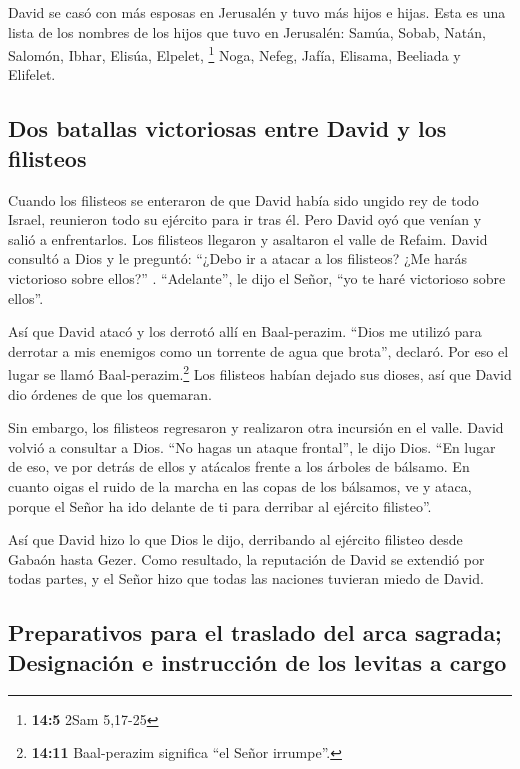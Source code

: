  David se casó con más esposas en Jerusalén y tuvo más
hijos e hijas.  Esta es una lista de los nombres de los
hijos que tuvo en Jerusalén: Samúa, Sobab, Natán, Salomón,
 Ibhar, Elisúa, Elpelet, \footnote{\textbf{14:5} 2Sam
  5,17-25}  Noga, Nefeg, Jafía,  Elisama,
Beeliada y Elifelet.

\hypertarget{dos-batallas-victoriosas-entre-david-y-los-filisteos}{%
\subsection{Dos batallas victoriosas entre David y los
filisteos}\label{dos-batallas-victoriosas-entre-david-y-los-filisteos}}

 Cuando los filisteos se enteraron de que David había sido
ungido rey de todo Israel, reunieron todo su ejército para ir tras él.
Pero David oyó que venían y salió a enfrentarlos.  Los
filisteos llegaron y asaltaron el valle de Refaim.  David
consultó a Dios y le preguntó: ``¿Debo ir a atacar a los filisteos? ¿Me
harás victorioso sobre ellos?'' . ``Adelante'', le dijo el Señor, ``yo
te haré victorioso sobre ellos''.

 Así que David atacó y los derrotó allí en Baal-perazim.
``Dios me utilizó para derrotar a mis enemigos como un torrente de agua
que brota'', declaró. Por eso el lugar se llamó Baal-perazim.\footnote{\textbf{14:11}
  Baal-perazim significa ``el Señor irrumpe''.}  Los
filisteos habían dejado sus dioses, así que David dio órdenes de que los
quemaran.

 Sin embargo, los filisteos regresaron y realizaron otra
incursión en el valle.  David volvió a consultar a Dios.
``No hagas un ataque frontal'', le dijo Dios. ``En lugar de eso, ve por
detrás de ellos y atácalos frente a los árboles de bálsamo.
 En cuanto oigas el ruido de la marcha en las copas de
los bálsamos, ve y ataca, porque el Señor ha ido delante de ti para
derribar al ejército filisteo''.

 Así que David hizo lo que Dios le dijo, derribando al
ejército filisteo desde Gabaón hasta Gezer.  Como
resultado, la reputación de David se extendió por todas partes, y el
Señor hizo que todas las naciones tuvieran miedo de David.

\hypertarget{preparativos-para-el-traslado-del-arca-sagrada-designaciuxf3n-e-instrucciuxf3n-de-los-levitas-a-cargo}{%
\subsection{Preparativos para el traslado del arca sagrada; Designación
e instrucción de los levitas a
cargo}\label{preparativos-para-el-traslado-del-arca-sagrada-designaciuxf3n-e-instrucciuxf3n-de-los-levitas-a-cargo}}

